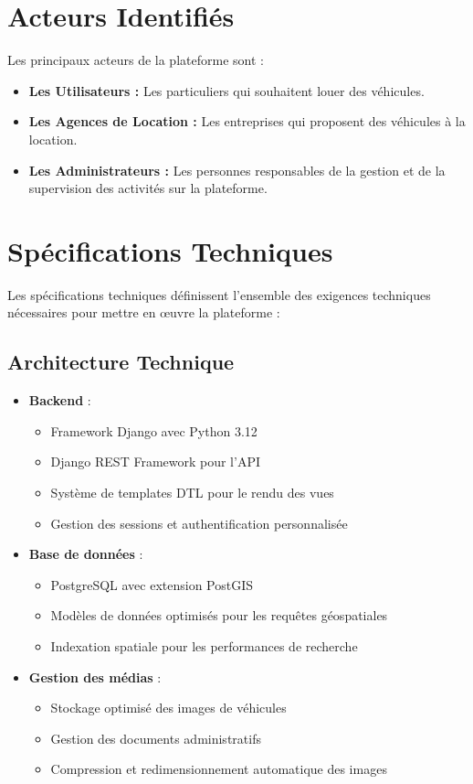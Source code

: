\section{Acteurs Identifiés}
Les principaux acteurs de la plateforme sont :
\begin{itemize}
    \item \textbf{Les Utilisateurs :} Les particuliers qui souhaitent louer des véhicules.
    \item \textbf{Les Agences de Location :} Les entreprises qui proposent des véhicules à la location.
    \item \textbf{Les Administrateurs :} Les personnes responsables de la gestion et de la supervision des activités sur la plateforme.
\end{itemize}

\section{Spécifications Techniques}
Les spécifications techniques définissent l'ensemble des exigences techniques nécessaires pour mettre en œuvre la plateforme :

\subsection{Architecture Technique}
\begin{itemize}
    \item \textbf{Backend} :
    \begin{itemize}
        \item Framework Django avec Python 3.12
        \item Django REST Framework pour l'API
        \item Système de templates DTL pour le rendu des vues
        \item Gestion des sessions et authentification personnalisée
    \end{itemize}
    
    \item \textbf{Base de données} :
    \begin{itemize}
        \item PostgreSQL avec extension PostGIS
        \item Modèles de données optimisés pour les requêtes géospatiales
        \item Indexation spatiale pour les performances de recherche
    \end{itemize}
    
    \item \textbf{Gestion des médias} :
    \begin{itemize}
        \item Stockage optimisé des images de véhicules
        \item Gestion des documents administratifs
        \item Compression et redimensionnement automatique des images
    \end{itemize}
\end{itemize}

